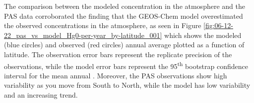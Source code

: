 \begin{table}[H]
\label{tab:modelvsobs metrics}

\centering
{}

\end{table}
\begin{flushleft}
 
\end{flushleft}


\begin{flushleft}
 The comparison between the modeled concentration in the atmosphere and the PAS data corroborated the finding that the GEOS-Chem model overestimated the observed concentrations in the atmosphere, as seen in Figure \ref{fig:06-12-22_pas_vs_model_Hg0-per-year_by-latitude_001} which shows the modeled (blue circles) and observed (red circles) annual average \hg plotted as a function of latitude. The observation error bars represent the replicate precision of the observations, while the model error bars represent the 95\textsuperscript{th} bootstrap confidence interval for the mean annual \hg. Moreover, the PAS observations show high variability as you move from South to North, while the model has low variability and an increasing trend.  
\end{flushleft}

